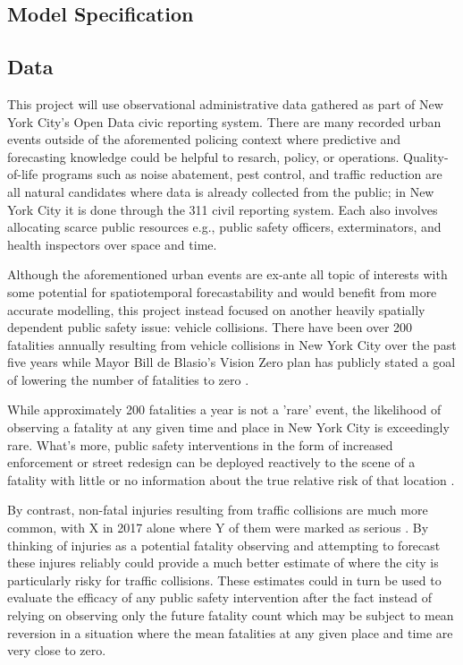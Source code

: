 \documentclass{article}
\begin{document}
\subsection{Model Specification}


\subsection{Data}

This project will use observational administrative data gathered as part of New York City's Open Data civic reporting system. There are many recorded urban events outside of the aforemented policing context where predictive and forecasting knowledge could be helpful to resarch, policy, or operations. Quality-of-life programs such as noise abatement, pest control, and traffic reduction are all natural candidates where data is already collected from the public; in New York City it is done through the 311 civil reporting system. Each also involves allocating scarce public resources e.g., public safety officers, exterminators, and health inspectors over space and time. \par

Although the aforementioned urban events are ex-ante all topic of interests with some potential for spatiotemporal forecastability and would benefit from more accurate modelling, this project instead focused on another heavily spatially dependent public safety issue: vehicle collisions. There have been over 200 fatalities annually resulting from vehicle collisions in New York City over the past five years while Mayor Bill de Blasio's Vision Zero plan has publicly stated a goal of lowering the number of fatalities to zero \cite{nyc_vz}. \par

While approximately 200 fatalities a year is not a 'rare' event, the likelihood of observing a fatality at any given time and place in New York City is exceedingly rare. What's more, public safety interventions in the form of increased enforcement or street redesign can be deployed reactively to the scene of a fatality with little or no information about the true relative risk of that location . \par

By contrast, non-fatal injuries resulting from traffic collisions are much more common, with X in 2017 alone where Y of them were marked as serious . By thinking of injuries as a potential fatality observing and attempting to forecast these injures reliably could provide a much better estimate of where the city is particularly risky for traffic collisions. These estimates could in turn be used to evaluate the efficacy of any public safety intervention after the fact instead of relying on observing only the future fatality count which may be subject to mean reversion in a situation where the mean fatalities at any given place and time are very close to zero.
\end{document}
